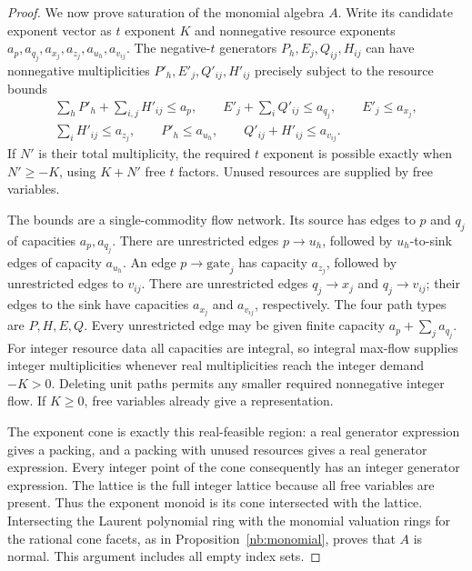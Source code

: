 \begin{proof}
We now prove saturation of the monomial algebra $A$. Write its
candidate exponent vector as $t$ exponent $K$ and nonnegative
resource exponents $a_p,a_{q_j},a_{x_j},a_{z_j},a_{u_h},a_{v_{ij}}$.
The negative-$t$ generators $P_h,E_j,Q_{ij},H_{ij}$ can have
nonnegative multiplicities $P'_h,E'_j,Q'_{ij},H'_{ij}$ precisely
subject to the resource bounds
\begin{equation}\label{nb:flow-bounds}
 \begin{gathered}
 \sum_hP'_h+\sum_{i,j}H'_{ij}\leq a_p,\qquad
 E'_j+\sum_iQ'_{ij}\leq a_{q_j},\qquad E'_j\leq a_{x_j},\\
 \sum_iH'_{ij}\leq a_{z_j},\qquad P'_h\leq a_{u_h},\qquad
 Q'_{ij}+H'_{ij}\leq a_{v_{ij}}.
 \end{gathered}
\end{equation}
If $N'$ is their total multiplicity, the required $t$ exponent is
possible exactly when $N'\geq-K$, using $K+N'$ free $t$ factors.
Unused resources are supplied by free variables.

The bounds are a single-commodity flow network. Its source has
edges to $p$ and $q_j$ of capacities $a_p,a_{q_j}$. There are
unrestricted edges $p\to u_h$, followed by $u_h$-to-sink edges of
capacity $a_{u_h}$. An edge $p\to\mathrm{gate}_j$ has capacity
$a_{z_j}$, followed by unrestricted edges to $v_{ij}$. There are
unrestricted edges $q_j\to x_j$ and $q_j\to v_{ij}$; their edges
to the sink have capacities $a_{x_j}$ and $a_{v_{ij}}$, respectively.
The four path types are $P,H,E,Q$. Every unrestricted edge may be
given finite capacity $a_p+\sum_j a_{q_j}$. For integer resource
data all capacities are integral, so integral max-flow supplies
integer multiplicities whenever real multiplicities reach the
integer demand $-K>0$. Deleting unit paths permits any smaller
required nonnegative integer flow. If $K\geq0$, free variables
already give a representation.

The exponent cone is exactly this real-feasible region: a real
generator expression gives a packing, and a packing with unused
resources gives a real generator expression. Every integer point
of the cone consequently has an integer generator expression. The
lattice is the full integer lattice because all free variables are
present. Thus the exponent monoid is its cone intersected with the
lattice. Intersecting the Laurent polynomial ring with the monomial
valuation rings for the rational cone facets, as in
Proposition~\ref{nb:monomial}, proves that $A$ is normal. This
argument includes all empty index sets.


\end{proof}
